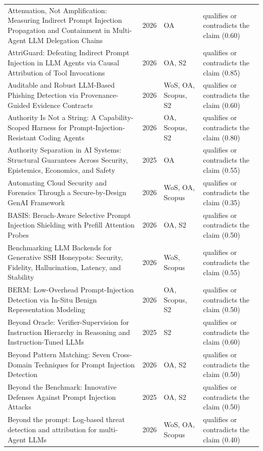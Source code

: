 \begin{longtable}{@{}%
  >{\raggedright\arraybackslash}p{}c%
  >{\raggedright\arraybackslash}p{}%
  >{\raggedright\arraybackslash}p{}@{}}
Attenuation, Not Amplification: Measuring Indirect Prompt Injection Propagation and Containment in Multi-Agent LLM Delegation Chains & 2026 & OA & qualifies or contradicts the claim (0.60) \\
AttriGuard: Defeating Indirect Prompt Injection in LLM Agents via Causal Attribution of Tool Invocations & 2026 & OA, S2 & qualifies or contradicts the claim (0.85) \\
Auditable and Robust LLM-Based Phishing Detection via Provenance-Guided Evidence Contracts & 2026 & WoS, OA, Scopus, S2 & qualifies or contradicts the claim (0.60) \\
Authority Is Not a String: A Capability-Scoped Harness for Prompt-Injection-Resistant Coding Agents & 2026 & OA, Scopus, S2 & qualifies or contradicts the claim (0.80) \\
Authority Separation in AI Systems: Structural Guarantees Across Security, Epistemics, Economics, and Safety & 2025 & OA & qualifies or contradicts the claim (0.55) \\
Automating Cloud Security and Forensics Through a Secure-by-Design GenAI Framework & 2026 & WoS, OA, Scopus & qualifies or contradicts the claim (0.35) \\
BASIS: Breach-Aware Selective Prompt Injection Shielding with Prefill Attention Probes & 2026 & OA, S2 & qualifies or contradicts the claim (0.50) \\
Benchmarking LLM Backends for Generative SSH Honeypots: Security, Fidelity, Hallucination, Latency, and Stability & 2026 & WoS, Scopus & qualifies or contradicts the claim (0.55) \\
BERM: Low-Overhead Prompt-Injection Detection via In-Situ Benign Representation Modeling & 2026 & OA, Scopus, S2 & qualifies or contradicts the claim (0.50) \\
Beyond Oracle: Verifier-Supervision for Instruction Hierarchy in Reasoning and Instruction-Tuned LLMs & 2025 & S2 & qualifies or contradicts the claim (0.60) \\
Beyond Pattern Matching: Seven Cross-Domain Techniques for Prompt Injection Detection & 2026 & OA, S2 & qualifies or contradicts the claim (0.50) \\
Beyond the Benchmark: Innovative Defenses Against Prompt Injection Attacks & 2025 & OA, S2 & qualifies or contradicts the claim (0.50) \\
Beyond the prompt: Log-based threat detection and attribution for multi-Agent LLMs & 2026 & WoS, OA, Scopus & qualifies or contradicts the claim (0.40) \\

\end{longtable}
